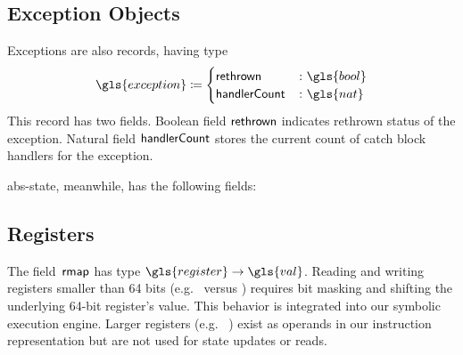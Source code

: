 \subsection{Exception Objects}
\begin{definition}
  Exceptions are also records, having type
  \begin{equation*}
    \gls{exception}\coloneqq\begin{cases}
      \rethrown &\colon \gls{bool} \\
      \handlerCount &\colon \gls{nat}
    \end{cases}
  \end{equation*}
  This record has two fields.
  Boolean field $\mathsf{rethrown}$ indicates rethrown status of the exception.
  Natural field $\mathsf{handlerCount}$ stores the current count of catch block handlers for the exception.
\end{definition}
\Gls{abs-state}, meanwhile, has the following fields:

\subsection{Registers}
The field~$\operatorname{\mathsf{rmap}}$ has type $\gls{register}\to\gls{val}$.
Reading and writing registers smaller than 64 bits (e.g.\  versus \rbp) requires bit masking and shifting the underlying 64-bit register's value.
This behavior is integrated into our symbolic execution engine.
Larger registers (e.g.\ %
) exist as operands in our instruction representation but are not used for state updates or reads.


